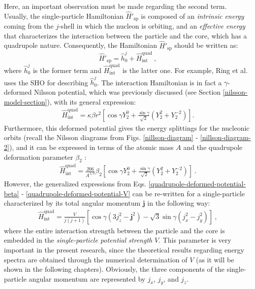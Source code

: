 Here, an important observation must be made regarding the second term. Usually, the single-particle Hamiltonian $\hat{H}'_\text{sp}$ is composed of an \emph{intrinsic energy} coming from the $j$-shell in which the nucleon is orbiting, and an \emph{effective energy} that characterizes the interaction between the particle and the core, which has a quadrupole nature. Consequently, the Hamiltonian $\hat{H}'_\text{sp}$ should be written as: $$\hat{H}'_\text{sp}=\hat{h}_0^j+\hat{H}_\text{int}^\text{quad}\ ,$$where $\hat{h}_0^j$ is the former term and $\hat{H}_\text{int}^\text{quad}$ is the latter one.
For example, Ring et al. \cite{ring2004nuclear} uses the SHO for describing $\hat{h}_0^j$. The interaction Hamiltonian is in fact a $\gamma$-deformed Nilsson potential, which was previously discussed (see Section \ref{nilsson-model-section}), with its general expression:
\begin{align}
    \hat{H}_\text{int}^\text{quad}=\kappa\beta r^2\left[\cos\gamma Y_{2}^{0}+\frac{\sin\gamma}{\sqrt{2}}\left(Y_2^2+Y_2^{-2}\right)\right].
    \label{quadrupole-deformed-potential-beta}
\end{align}
Furthermore, this deformed potential gives the energy splittings for the nucleonic orbits (recall the Nilsson diagrams from Figs. \ref{nillson-diagram} - \ref{nillson-diagram-2}), and it can be expressed in terms of the atomic mass $A$ and the quadrupole deformation parameter $\beta_2$ \cite{peng2003description}:
\begin{align}
    \hat{H}_\text{int}^\text{quad}=\frac{206}{A^{1/3}}\beta_2\left[\cos\gamma Y_2^0+\frac{\sin\gamma}{\sqrt{2}}(Y_2^2+Y_2^{-2})\right]\ .
    \label{quadrupole-deformed-potential-V}
\end{align}
However, the generalized expressions from Eqs. \ref{quadrupole-deformed-potential-beta} - \ref{quadrupole-deformed-potential-V} can be re-written for a single-particle characterized by its total angular momentum $\mathbf{j}$ in the following way:
\begin{align}
    \hat{H}_\text{int}^\text{quad}=\frac{V}{j(j+1)}\left[\cos\gamma(3j_z^2-\mathbf{j}^2)-\sqrt{3}\sin\gamma(j_x^2-j_y^2)\right]\ ,
    \label{single-particle-nilsson-defored-potential}
\end{align}
where the entire interaction strength between the particle and the core is embedded in the \emph{single-particle potential strength} $V$. This parameter is very important in the present research, since the theoretical results regarding energy spectra are obtained through the numerical determination of $V$ (as it will be shown in the following chapters). Obviously, the three components of the single-particle angular momentum are represented by $j_x$, $j_y$, and $j_z$.

